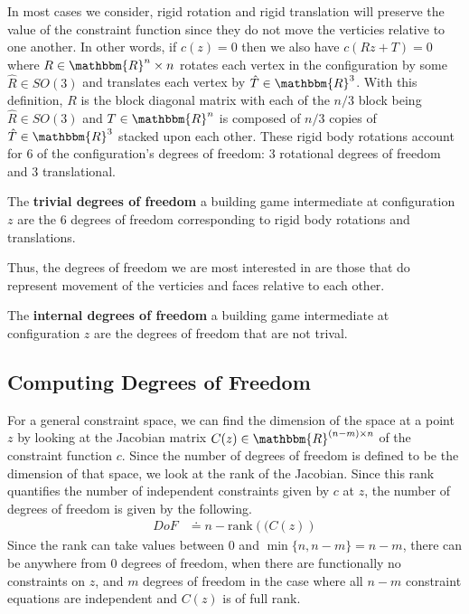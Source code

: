 In most cases we consider, rigid rotation and rigid translation will preserve the value of the constraint function since they do not move the verticies relative to one another. In other words, if $c(z) = 0$ then we also have $c(Rz + T) = 0$ where $R \in \mathbbm{R}^{n}\times n$ rotates each vertex in the configuration by some $\hat{R} \in SO(3)$ and translates each vertex by $\hat{T} \in \mathbbm{R}^3$. With this definition, $R$ is the block diagonal matrix with each of the $n/3$ block being $\hat{R} \in SO(3)$ and $T \in \mathbbm{R}^n$ is composed of $n/3$ copies of $\hat{T} \in \mathbbm{R}^3$ stacked upon each other. These rigid body rotations account for $6$ of the configuration's degrees of freedom: $3$ rotational degrees of freedom and $3$ translational.
\begin{mydef}
The \textbf{trivial degrees of freedom} a building game intermediate at configuration $z$ are the $6$ degrees of freedom corresponding to rigid body rotations and translations.
\end{mydef}
Thus, the degrees of freedom we are most interested in are those that do represent movement of the verticies and faces relative to each other. 
\begin{mydef}
The \textbf{internal degrees of freedom} a building game intermediate at configuration $z$ are the degrees of freedom that are not trival.
\end{mydef}

\subsection{Computing Degrees of Freedom}

For a general constraint space, we can find the dimension of the space at a point $z$ by looking at the Jacobian matrix $C(z) \in \mathbbm{R}^{(n-m)\times n}$ of the constraint function $c$. Since the number of degrees of freedom is defined to be the dimension of that space, we look at the rank of the Jacobian. Since this rank quantifies the number of independent constraints given by $c$ at $z$, the number of degrees of freedom is given by the following.
\begin{align}
DoF &\doteq n - \text{rank}\left((C(z)\right)
\end{align}
Since the rank can take values between $0$ and $\min\{n,n-m\} = n-m$, there can be anywhere from $0$ degrees of freedom, when there are functionally no constraints on $z$, and $m$ degrees of freedom in the case where all $n-m$ constraint equations are independent and $C(z)$ is of full rank. 

